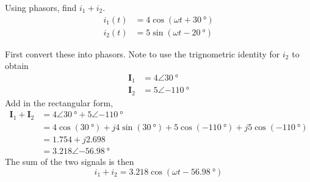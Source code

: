 \documentclass{article}
\begin{document}
\begin{example}
    Using phasors, find $i_1+i_2$.
    \begin{align*}
        i_1(t)&=4\cos(\omega t+\SI{30}{\degree})\\
        i_2(t)&=5\sin(\omega t-\SI{20}{\degree})
    \end{align*}
\end{example}
\begin{sol}
    First convert these into phasors. Note to use the trignometric identity for $i_2$ to obtain
    \begin{align*}
        \mathbf I_1&=4\angle\SI{30}{\degree}\\
        \mathbf I_2&=5\angle\SI{-110}{\degree}
    \end{align*}
    Add in the rectangular form, 
    \begin{equation}
        \begin{aligned}
            \mathbf I_1+\mathbf I_2&=4\angle\SI{30}{\degree}+5\angle\SI{-110}{\degree}\\
            &=4\cos(\SI{30}{\degree})+j4\sin(\SI{30}{\degree})+5\cos(\SI{-110}{\degree})+j5\cos(\SI{-110}{\degree})\\
            &=1.754+j2.698\\
            &=3.218\angle \SI{-56.98}{\degree}
        \end{aligned}
    \end{equation}
    The sum of the two signals is then 
    \begin{equation}
        i_1+i_2=3.218\cos(\omega t-\SI{56.98}{\degree})
    \end{equation}
\end{sol}
\end{document}
